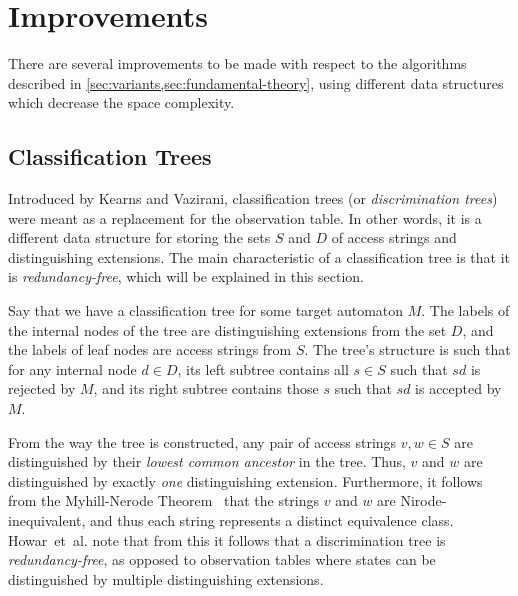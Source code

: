 \documentclass[multi,crop=false,class=article]{standalone}
\begin{document}
\section{Improvements}
\label{sec:improvements}
There are several improvements to be made with respect to the algorithms
described in \cref{sec:variants,sec:fundamental-theory}, using different data
structures which decrease the space complexity.

\subsection{Classification Trees}
\label{sec:classification-trees}
Introduced by Kearns and Vazirani\cite{Kearns94}, classification trees (or
\textit{discrimination trees}) were meant as a replacement for the observation
table. In other words, it is a different data
structure for storing the sets $S$ and $D$ of access strings and distinguishing
extensions. The main characteristic of a classification tree is that it is
\textit{redundancy-free}, which will be explained in this section.

Say that we have a classification tree for some target automaton $M$. The labels
of the internal nodes of the tree are distinguishing extensions from the set
$D$, and the labels of leaf nodes are access strings from $S$. The tree's
structure is such that for any internal node $d \in D$, its left subtree
contains all $s \in S$ such that $sd$ is rejected by $M$, and its right subtree
contains those $s$ such that $sd$ is accepted by $M$.

From the way the tree is constructed, any pair of access strings $v,w \in S$ are
distinguished by their \textit{lowest common ancestor} in the tree. Thus, $v$
and $w$ are distinguished by exactly \textit{one} distinguishing
extension. Furthermore, it follows from the Myhill-Nerode
Theorem~ that the strings $v$ and $w$ are
Nirode-inequivalent, and thus each string represents a distinct equivalence
class. Howar~et~al. note that from this it follows
that a discrimination tree is \textit{redundancy-free}, as opposed to
observation tables where states can be distinguished by multiple distinguishing
extensions\cite{Howar14}.
\end{document}
